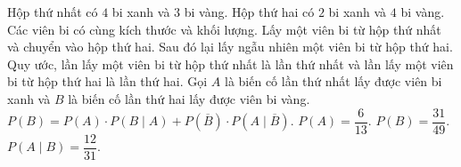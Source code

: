 \begin{ex}
Hộp thứ nhất có $4$ bi xanh và $3$ bi vàng. Hộp thứ hai có $2$ bi xanh và $4$ bi vàng. Các viên bi có cùng kích thước và khối lượng. Lấy một viên bi từ hộp thứ nhất và chuyển vào hộp thứ hai. Sau đó lại lấy ngẫu nhiên một viên bi từ hộp thứ hai. Quy ước, lần lấy một viên bi từ hộp thứ nhất là lần thứ nhất và lần lấy một viên bi từ hộp thứ hai là lần thứ hai. Gọi $A$ là biến cố lần thứ nhất lấy được viên bi xanh và $B$ là biến cố lần thứ hai lấy được viên bi vàng.
\choiceTF
{$P(B)=P(A)\cdot P(B\mid A)+P(\overline B)\cdot P(A\mid\overline B)$.}
{$P(A)=\dfrac6{13}$.}
{\True $P(B)=\dfrac{31}{49}$.}
{$P(A\mid B)=\dfrac{12}{31}$.}
\end{ex}
